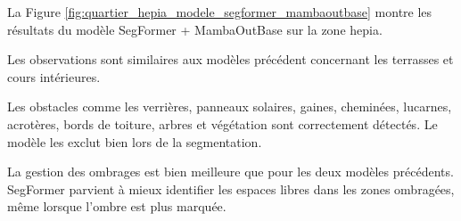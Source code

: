 
\newpage
La Figure \ref{fig:quartier_hepia_modele_segformer_mambaoutbase} montre les résultats du modèle SegFormer + MambaOutBase sur la zone \acrshort{hepia}.

Les observations sont similaires aux modèles précédent concernant les terrasses et cours intérieures.

Les obstacles comme les verrières, panneaux solaires, gaines, cheminées, lucarnes, acrotères, bords de toiture, arbres et végétation sont correctement détectés. Le modèle les exclut bien lors de la segmentation.

La gestion des ombrages est bien meilleure que pour les deux modèles précédents. SegFormer parvient à mieux identifier les espaces libres dans les zones ombragées, même lorsque l'ombre est plus marquée.

